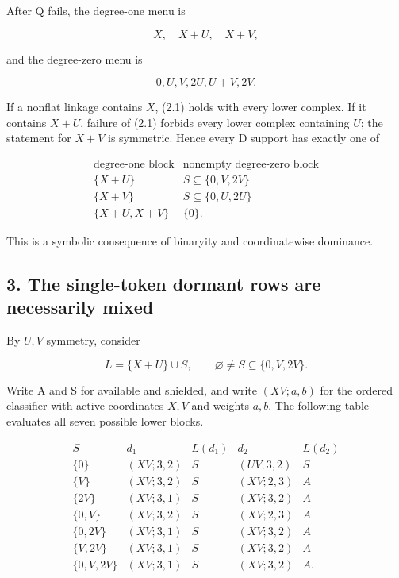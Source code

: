 After Q fails, the degree-one menu is

\[
                         X,\quad X+U,\quad X+V,          \tag{2.2}
\]

and the degree-zero menu is

\[
                         0,U,V,2U,U+V,2V.               \tag{2.3}
\]

If a nonflat linkage contains \(X\), (2.1) holds with every lower
complex. If it contains \(X+U\), failure of (2.1) forbids every lower
complex containing \(U\); the statement for \(X+V\) is symmetric. Hence
every D support has exactly one of

\[
\begin{array}{c|c}
\text{degree-one block}&\text{nonempty degree-zero block}\\ \hline
\{X+U\}&S\subseteq\{0,V,2V\}\\
\{X+V\}&S\subseteq\{0,U,2U\}\\
\{X+U,X+V\}&\{0\}.
\end{array}                                             \tag{2.4}
\]

This is a symbolic consequence of binaryity and coordinatewise
dominance.

\subsection{3. The single-token dormant rows are necessarily
mixed}

By \(U,V\) symmetry, consider

\[
                         L=\{X+U\}\cup S,\qquad
             \varnothing\ne S\subseteq\{0,V,2V\}.       \tag{3.1}
\]

Write A and S for available and shielded, and write \((XV;a,b)\) for the
ordered classifier with active coordinates \(X,V\) and weights \(a,b\).
The following table evaluates all seven possible lower blocks.

\[
\begin{array}{c|c|c|c|c}
S&d_1&L(d_1)&d_2&L(d_2)\\ \hline
\{0\}&(XV;3,2)&S&(UV;3,2)&S\\
\{V\}&(XV;3,2)&S&(XV;2,3)&A\\
\{2V\}&(XV;3,1)&S&(XV;3,2)&A\\
\{0,V\}&(XV;3,2)&S&(XV;2,3)&A\\
\{0,2V\}&(XV;3,1)&S&(XV;3,2)&A\\
\{V,2V\}&(XV;3,1)&S&(XV;3,2)&A\\
\{0,V,2V\}&(XV;3,1)&S&(XV;3,2)&A .
\end{array}                                             \tag{3.2}
\]

